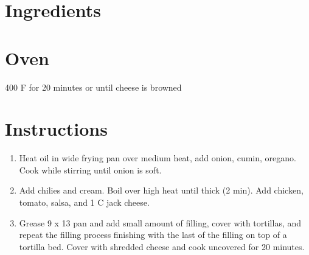 \documentclass[letterpaper,10pt,english]{sphinxmanual}
\begin{document}
\section{Ingredients}
\label{\detokenize{Chicken_EC:ingredients}}
%
\begin{sphinxVerbatim}[commandchars=\\\{\}]
  

  

  

  

   

   

   

  

    

   

    

  
\end{sphinxVerbatim}


\section{Oven}
\label{\detokenize{Chicken_EC:oven}}
400 F for 20 minutes or until cheese is browned


\section{Instructions}
\label{\detokenize{Chicken_EC:instructions}}\begin{enumerate}
\item {} 
Heat oil in wide frying pan over medium heat, add onion, cumin, oregano. Cook while stirring until onion is soft.

\item {} 
Add chilies and cream. Boil over high heat until thick (2 min). Add chicken, tomato, salsa, and 1 C jack cheese.

\item {} 
Grease 9 x 13 pan and add small amount of filling, cover with tortillas, and repeat the filling process finishing with the last of the filling on top of a tortilla bed.  Cover with shredded cheese and cook uncovered for 20 minutes.

\end{enumerate}
\end{document}
